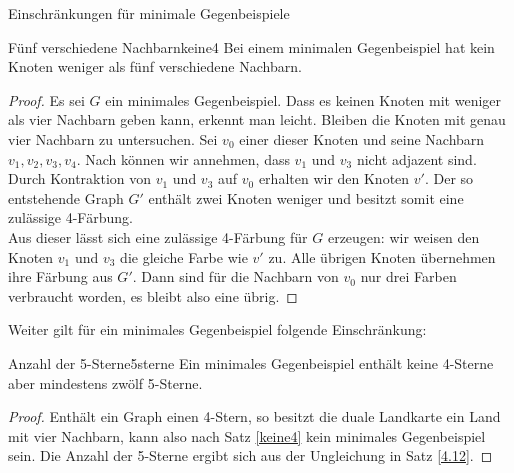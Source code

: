 \begin{section}{Einschränkungen für minimale Gegenbeispiele}
 \begin{satzl}{Fünf verschiedene Nachbarn}{keine4}
  Bei einem minimalen Gegenbeispiel hat kein Knoten weniger als fünf verschiedene Nachbarn.
 \end{satzl}
 \begin{proof}
  Es sei $G$ ein minimales Gegenbeispiel. Dass es keinen Knoten mit weniger als vier Nachbarn geben kann, erkennt man leicht. Bleiben die Knoten mit genau vier Nachbarn zu untersuchen. Sei $v_0$ einer dieser Knoten und seine Nachbarn $v_1,v_2,v_3,v_4$. Nach  können wir annehmen, dass $v_1$ und $v_3$ nicht adjazent sind. Durch Kontraktion von $v_1$ und $v_3$ auf $v_0$ erhalten wir den Knoten $v'$. Der so entstehende Graph $G'$ enthält zwei Knoten weniger und besitzt somit eine zulässige 4-Färbung.\\
  Aus dieser lässt sich eine zulässige 4-Färbung für $G$ erzeugen: wir weisen den Knoten $v_1$ und $v_3$ die gleiche Farbe wie $v'$ zu. Alle übrigen Knoten übernehmen ihre Färbung aus $G'$. Dann sind für die Nachbarn von $v_0$ nur drei Farben verbraucht worden, es bleibt also eine übrig.
 \end{proof}
 
 Weiter gilt für ein minimales Gegenbeispiel folgende Einschränkung:
 
 \begin{satzl}{Anzahl der 5-Sterne}{5sterne}
  Ein minimales Gegenbeispiel enthält keine 4-Sterne aber mindestens zwölf 5-Sterne.
 \end{satzl}
 \begin{proof}
  Enthält ein Graph einen 4-Stern, so besitzt die duale Landkarte ein Land mit vier Nachbarn, kann also nach Satz \ref{keine4} kein minimales Gegenbeispiel sein. Die Anzahl der 5-Sterne ergibt sich aus der Ungleichung in Satz \ref{4.12}.
 \end{proof}


\end{section}